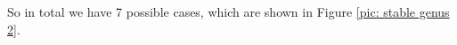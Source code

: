 \documentclass[a4paper,12 pt,titlepage,twoside]{book}
\theoremstyle{plain}
\theoremstyle{theorem}
\theoremstyle{definition}
\theoremstyle{remark}
\begin{document}
	So in total we have 7 possible cases, which are shown in Figure \ref{pic: stable genus 2}.
		
\end{document}
